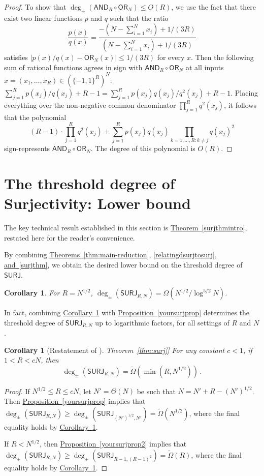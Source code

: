 \documentclass[11pt]{article}
\numberwithin{equation}{section}
\newtheorem{corollary}[theorem]{Corollary}
\theoremstyle{definition}
\theoremstyle{plain}
\newcommand{\expref}[2]{\hyperref[#2]{#1~\ref{#2}}}
\newcommand{\SURJ}{\mathsf{ SURJ}}
\newcommand{\OR}{\mathsf{ OR}}
\newcommand{\bits}{\{-1,1\}}
\newcommand{\AND}{\mathsf{AND}}
\begin{document}
\begin{proof}
	To show that $\deg_{\pm}(\AND_R \circ \OR_N) \leq O(R)$, we use the fact that there exist two linear functions $p$ and $q$ such that the ratio
	$$\frac{p(x)}{q(x)} = \frac{-\left(N - \sum_{i=1}^N x_i\right) + 1/(3R)}{\left(N - \sum_{i=1}^N x_i \right)+ 1/(3R)}$$
	satisfies $|p(x) / q(x) - \OR_N(x)| \le 1 / (3R)$ for every $x$. 
	Then the following sum of rational functions agrees in sign with $\AND_R \circ \OR_N$
	at all inputs $x=(x_1, \dots, x_R) \in \left(\bits^R\right)^N$: $\sum_{j=1}^R p(x_j)/q(x_j) + R-1= \sum_{j=1}^R p(x_j)q(x_j)/q^2(x_j) + R-1$.
	Placing everything over the non-negative common denominator $\prod_{j=1}^R q^2(x_j)$, it follows that the polynomial $$(R-1) \cdot \prod_{j=1}^R q^2(x_j) + \sum_{j=1}^R p(x_j) q(x_j) \prod_{k=1, \dots, R \colon k \neq j} q(x_j)^2$$
	sign-represents $\AND_R \circ \OR_N$. The degree of this polynomial is  $O(R)$.
\end{proof}


\section{The threshold degree of Surjectivity: Lower bound}
\label{s:surj}
The key technical result established in this section is \expref{Theorem}{surjthmintro}, restated here for the reader's convenience.
\surjthmintro*

By combining \expref{Theorems}{thm:main-reduction}, \ref{relatingdsurjtosurj}, \expref{and}{surjthm}, we obtain the desired lower bound on the threshold 
degree of $\SURJ$.
\begin{corollary} \label{surjcor}
	For $R=N^{1/2}$, $\deg_{\pm}(\SURJ_{R, N}) = \Omega(N^{1/2}/\log^{5/2} N)$. 
\end{corollary}

In fact, combining \expref{Corollary}{surjcor} with \expref{Proposition}{yoursurjprop} %
determines %
 the threshold degree of $\SURJ_{R, N}$ up to logarithmic factors,
for all settings of $R$ and $N$.

\begin{corollary}[Restatement of \expref{Theorem}{thm:surj}]
  For any constant $c<1$, if $1 < R < cN$, then
%
\[ \deg_{\pm}\left(\SURJ_{R, N}\right) = 
\tilde{\Omega}\left(\min(R, N^{1/2})\right) \,.\]
\end{corollary}
\begin{proof}
	If $N^{1/2} \leq R \leq cN$, let $N'=\Theta(N)$ be such that $N = N' + R - (N')^{1/2}$. Then \expref{Proposition}{yoursurjprop} implies that 
	$\deg_{\pm}\left(\SURJ_{R, N}\right) \geq \deg_{\pm}\left(\SURJ_{(N')^{1/2}, N'}\right) = \tilde{\Omega}(N^{1/2})$, where the final
	equality holds by \expref{Corollary}{surjcor}.
	
	If $R < N^{1/2}$, then \expref{Proposition}{yoursurjprop2} 
	implies that $\deg_{\pm}(\SURJ_{R, N}) \geq \deg_{\pm}(\SURJ_{R-1, (R-1)^2}) = \tilde{\Omega}(R)$,
	where the final equality holds by \expref{Corollary}{surjcor}.
\end{proof}
\end{document}
